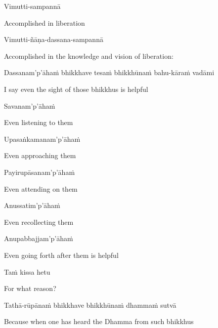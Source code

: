 Vimutti-sampannā

\begin{english}
  Accomplished in liberation
\end{english}

Vimutti-ñāṇa-dassana-sampannā

\begin{english}
  Accomplished in the knowledge and vision of liberation:
\end{english}

\begin{pali-hang}
  Dassanam'p'āhaṁ bhikkhave tesaṁ bhikkhūnaṁ bahu-kāraṁ vadāmi
\end{pali-hang}

\begin{english}
  I say even the sight of those bhikkhus is helpful
\end{english}

Savanam'p'āhaṁ

\begin{english}
  Even listening to them
\end{english}

Upasaṅkamanam'p'āhaṁ

\begin{english}
  Even approaching them
\end{english}

Payirupāsanam'p'āhaṁ

\begin{english}
  Even attending on them
\end{english}

Anussatim'p'āhaṁ

\begin{english}
  Even recollecting them
\end{english}

Anupabbajjam'p'āhaṁ

\begin{english}
  Even going forth after them is helpful
\end{english}

Taṁ kissa hetu

\begin{english}
  For what reason?
\end{english}

Tathā-rūpānaṁ bhikkhave bhikkhūnaṁ dhammaṁ sutvā

\begin{english}
  Because when one has heard the Dhamma from such bhikkhus
\end{english}


